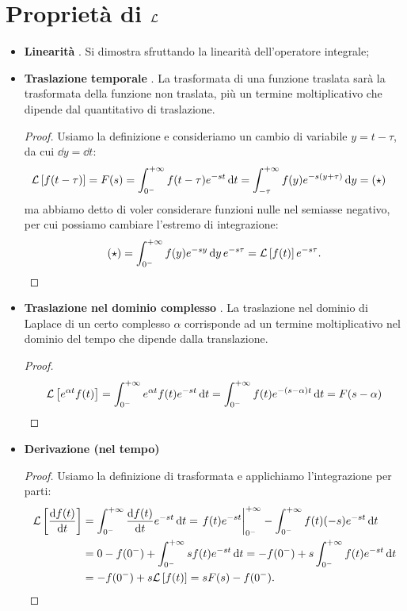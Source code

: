 \section{Proprietà di $\mathcal{L}$}
\begin{itemize}
	\item \textbf{Linearità} \rarr {} . Si dimostra sfruttando la linearità dell'operatore integrale;
	\item \textbf{Traslazione temporale} \rarr {} . La trasformata di una funzione traslata sarà la trasformata della funzione non traslata, più un termine moltiplicativo che dipende dal quantitativo di traslazione.
	\begin{proof}
	Usiamo la definizione e consideriamo un cambio di variabile $y = t-\tau$, da cui $\dd{y} = \dd{t}$:
	\begin{align*}
		\mathcal{L}\left[ f(t-\tau) \right] = F(s) & = \int_{0^-}^{+\infty} f(t-\tau) e^{-st} \dd{t} = \int_{-\tau}^{+\infty} f(y)e^{-s(y+\tau)} \dd{y} = (\star)
	\end{align*}
	ma abbiamo detto di voler considerare funzioni nulle nel semiasse negativo, per cui possiamo cambiare l'estremo di integrazione:
	\begin{equation*}
		(\star) = \int_{0^-}^{+\infty} f(y)e^{-sy}\dd{y} e^{-s\tau} = \mathcal{L}\left[ f(t) \right]e^{-s\tau}.
	\end{equation*}
	\end{proof}
	\item \textbf{Traslazione nel dominio complesso} \rarr {} . La traslazione nel dominio di Laplace  di un certo complesso $\alpha$ corrisponde ad un termine moltiplicativo nel dominio del tempo che dipende dalla translazione.
	\begin{proof}
		\begin{equation*}
		\mathcal{L}\left[ e^{\alpha t}f(t) \right]  = \int_{0^-}^{+\infty} e^{\alpha t}f(t) e^{-st} \dd{t} = \int_{0^-}^{+\infty} f(t) e^{-(s-\alpha)t} \dd{t} = F(s-\alpha) 		
		\end{equation*}
	\end{proof}
	\item \textbf{Derivazione (nel tempo)} \rarr {}
		\begin{proof}
	Usiamo la definizione di trasformata e applichiamo l'integrazione per parti:
	\begin{align*}
		\lt{\dv{f(t)}{t}} & = \ltint{\dv{f(t)}{t}}{-st}{t}	 = \eval{f(t)e^{-st}}_{0^-}^{\pinf} - \int_{0^-}^{\pinf} f(t)(-s)e^{-st} \dd{t} \\ & = 0 - f(0^-) + \int_{0^-}^{\pinf} sf(t)e^{-st} \dd{t} = - f(0^-) + s \int_{0^-}^{\pinf} f(t)e^{-st} \dd{t} \\ & = - f(0^-) + s \lt{f(t)} = sF(s) - f(0^-).

\end{align*}
\end{proof}
\end{itemize}

